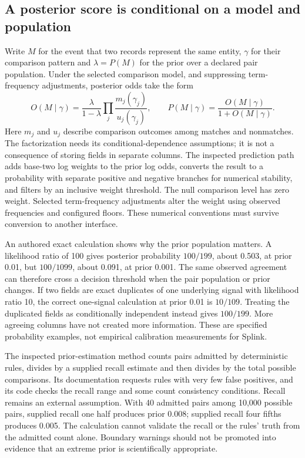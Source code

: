 \subsection{A posterior score is conditional on a model and population}
Write $M$ for the event that two records represent the same entity, $\gamma$ for their comparison pattern and $\lambda=P(M)$ for the prior over a declared pair population. Under the selected comparison model, and suppressing term-frequency adjustments, posterior odds take the form
\[
 O(M\mid\gamma)=\frac{\lambda}{1-\lambda}\prod_j\frac{m_j(\gamma_j)}{u_j(\gamma_j)},
 \qquad P(M\mid\gamma)=\frac{O(M\mid\gamma)}{1+O(M\mid\gamma)}.
\]
Here $m_j$ and $u_j$ describe comparison outcomes among matches and nonmatches. The factorization needs its conditional-dependence assumptions; it is not a consequence of storing fields in separate columns. The inspected prediction path adds base-two log weights to the prior log odds, converts the result to a probability with separate positive and negative branches for numerical stability, and filters by an inclusive weight threshold. The null comparison level has zero weight. Selected term-frequency adjustments alter the weight using observed frequencies and configured floors. These numerical conventions must survive conversion to another interface.\citep{exec24_splink_sources}

An authored exact calculation shows why the prior population matters. A likelihood ratio of 100 gives posterior probability $100/199$, about 0.503, at prior 0.01, but $100/1099$, about 0.091, at prior 0.001. The same observed agreement can therefore cross a decision threshold when the pair population or prior changes. If two fields are exact duplicates of one underlying signal with likelihood ratio 10, the correct one-signal calculation at prior 0.01 is $10/109$. Treating the duplicated fields as conditionally independent instead gives $100/199$. More agreeing columns have not created more information. These are specified probability examples, not empirical calibration measurements for Splink.\citep{exec24_splink_contract}

The inspected prior-estimation method counts pairs admitted by deterministic rules, divides by a supplied recall estimate and then divides by the total possible comparisons. Its documentation requests rules with very few false positives, and its code checks the recall range and some count consistency conditions. Recall remains an external assumption. With 40 admitted pairs among 10,000 possible pairs, supplied recall one half produces prior 0.008; supplied recall four fifths produces 0.005. The calculation cannot validate the recall or the rules' truth from the admitted count alone. Boundary warnings should not be promoted into evidence that an extreme prior is scientifically appropriate.\citep{exec24_splink_sources,exec24_splink_contract}

